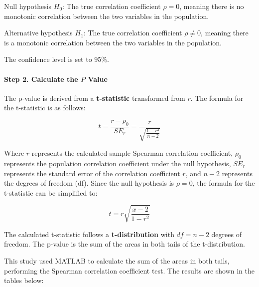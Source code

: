 \documentclass{article}
\begin{document}
	Null hypothesis \(H_0\): The true correlation coefficient \(\rho = 0\), meaning there is no monotonic correlation between the two variables in the population.
	
	Alternative hypothesis \(H_1\): The true correlation coefficient \(\rho \neq 0\), meaning there is a monotonic correlation between the two variables in the population.
	
	The confidence level is set to 95\%.
	
	\paragraph{Step 2. Calculate the \(P\) Value}
	
	The p-value is derived from a \textbf{t-statistic} transformed from \(r\). The formula for the t-statistic is as follows:
	
	\begin{equation}
		t = \frac{r - \rho_0}{SE_r} = \frac{r}{\sqrt{\frac{1-r^2}{n-2}}}
		\label{eq:t_test_correlation}
	\end{equation}
	
	Where \(r\) represents the calculated sample Spearman correlation coefficient, \(\rho_0\) represents the population correlation coefficient under the null hypothesis, \(SE_r\) represents the standard error of the correlation coefficient \(r\), and \(n-2\) represents the degrees of freedom (df). Since the null hypothesis is \(\rho = 0\), the formula for the t-statistic can be simplified to:
	
	\begin{equation}
		t = r \sqrt{\frac{x-2}{1-r^2}}
		\label{eq:t_test_simplified}
	\end{equation}
	
	The calculated t-statistic follows a \textbf{t-distribution} with \(\textit{df} = n - 2\) degrees of freedom. The p-value is the sum of the areas in both tails of the t-distribution.
	
	This study used MATLAB to calculate the sum of the areas in both tails, performing the Spearman correlation coefficient test. The results are shown in the tables below:
	
\end{document}
